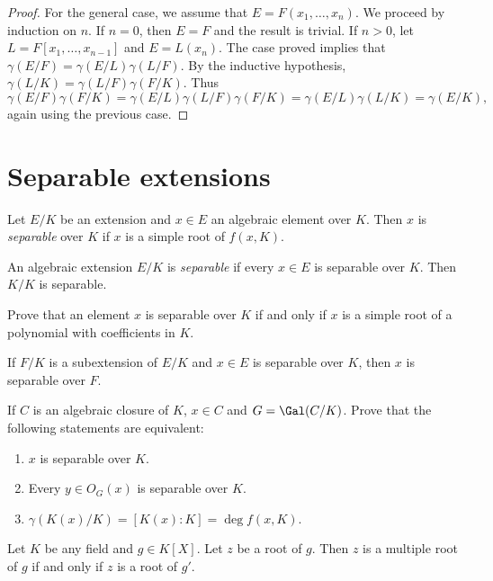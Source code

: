 \begin{proof}
    \medskip 
    For the general case, we assume that $E=F(x_1,\dots,x_n)$. We proceed
    by induction on $n$. If $n=0$, then $E=F$ and the result is trivial. 
    If $n>0$, let $L=F[x_1,\dots,x_{n-1}]$ and $E=L(x_n)$. The 
    case proved 
    implies that $\gamma(E/F)=\gamma(E/L)\gamma(L/F)$. By the inductive 
    hypothesis, $\gamma(L/K)=\gamma(L/F)\gamma(F/K)$. Thus 
    \[
    \gamma(E/F)\gamma(F/K)=\gamma(E/L)\gamma(L/F)\gamma(F/K)
    =\gamma(E/L)\gamma(L/K)=\gamma(E/K),
    \]
    again using the previous case. 
\end{proof}

\section{Separable extensions}

\begin{definition}
    Let $E/K$ be an extension and $x\in E$ an algebraic element over $K$. Then
    $x$ is \emph{separable} over $K$ if $x$ is a simple root
    of $f(x,K)$. 
\end{definition}

An algebraic extension $E/K$ is \emph{separable} 
if every $x\in E$ is separable over $K$. Then $K/K$ is separable. 

\begin{exercise}
    Prove that 
    an element $x$ is separable over $K$ if and only if $x$ is a simple root
    of a polynomial with coefficients in $K$. 
\end{exercise}

If $F/K$ is a subextension of $E/K$ and $x\in E$ is separable over $K$, then
$x$ is separable over $F$. 

\begin{exercise}
    If $C$ is an algebraic closure of $K$, $x\in C$ and $G=\Gal(C/K)$. 
    Prove that the following statements are equivalent:
    \begin{enumerate}
        \item $x$ is separable over $K$.
        \item Every $y\in O_G(x)$ is separable over $K$.
        \item $\gamma(K(x)/K)=[K(x):K]=\deg f(x,K)$. 
    \end{enumerate}
\end{exercise}

Let $K$ be any field and $g\in K[X]$. Let $z$ be a root of $g$. 
Then $z$ is a multiple root of $g$ if and only if $z$ is a root of $g'$. 

